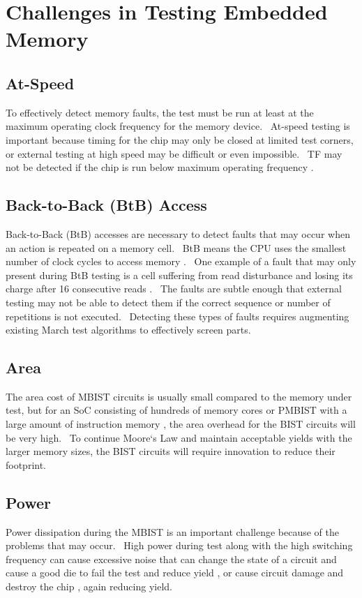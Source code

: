 \section{Challenges in Testing Embedded Memory}
\label{sect:bg-challenges}

\subsection{At-Speed}
To effectively detect memory faults, the test must be run at least at the maximum operating clock frequency for the memory device.  At-speed testing is important because timing for the chip may only be closed at limited test corners, or external testing at high speed may be difficult or even impossible.  TF may not be detected if the chip is run below maximum operating frequency \cite{1583992}.  

\subsection{Back-to-Back (BtB) Access}
Back-to-Back (BtB) accesses are necessary to detect faults that may occur when an action is repeated on a memory cell.  BtB means the CPU uses the smallest number of clock cycles to access memory \cite{5491773}.  One example of a fault that may only present during BtB testing is a cell suffering from read disturbance and losing its charge after 16 consecutive reads \cite{4079351}.  The faults are subtle enough that external testing may not be able to detect them if the correct sequence or number of repetitions is not executed.  Detecting these types of faults requires augmenting existing March test algorithms to effectively screen parts.  

\subsection{Area}
The area cost of MBIST circuits is usually small compared to the memory under test, but for an SoC consisting of hundreds of memory cores \cite{4711617} or PMBIST with a large amount of instruction memory \cite{5692281}, the area overhead for the BIST circuits will be very high.  To continue Moore`s Law and maintain acceptable yields with the larger memory sizes, the BIST circuits will require innovation to reduce their footprint.

\subsection{Power}
Power dissipation during the MBIST is an important challenge because of the problems that may occur.  High power during test along with the high switching frequency can cause excessive noise that can change the state of a circuit and cause a good die to fail the test and reduce yield \cite{NovelBist}, or cause circuit damage and destroy the chip \cite{1329365}, again reducing yield.


